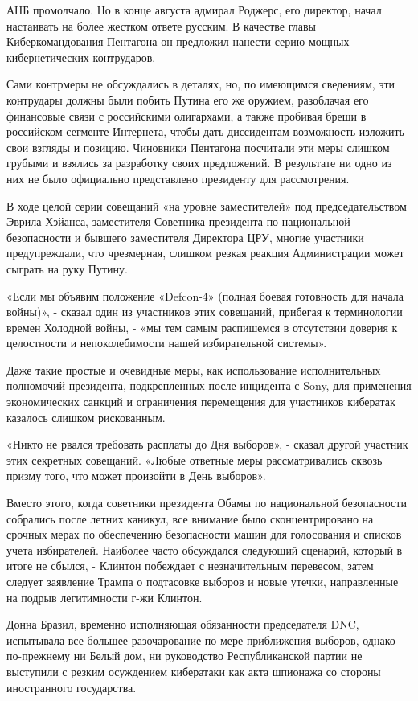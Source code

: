 АНБ промолчало. Но в конце августа адмирал Роджерс, его директор, начал
настаивать на более жестком ответе русским. В качестве главы
Киберкомандования Пентагона он предложил нанести серию мощных
кибернетических контрударов.

Сами контрмеры не обсуждались в деталях, но, по имеющимся сведениям, эти
контрудары должны были побить Путина его же оружием, разоблачая его
финансовые связи с российскими олигархами, а также пробивая бреши в
российском сегменте Интернета, чтобы дать диссидентам возможность
изложить свои взгляды и позицию. Чиновники Пентагона посчитали эти меры
слишком грубыми и взялись за разработку своих предложений. В результате
ни одно из них не было официально представлено президенту для
рассмотрения.

В ходе целой серии совещаний «на уровне заместителей» под
председательством Эврила Хэйанса, заместителя Советника президента по
национальной безопасности и бывшего заместителя Директора ЦРУ, многие
участники предупреждали, что чрезмерная, слишком резкая реакция
Администрации может сыграть на руку Путину.

«Если мы объявим положение «Defcon-4» (полная боевая готовность для
начала войны)», - сказал один из участников этих совещаний, прибегая к
терминологии времен Холодной войны, - «мы тем самым распишемся в
отсутствии доверия к целостности и непоколебимости нашей избирательной
системы».

Даже такие простые и очевидные меры, как использование исполнительных
полномочий президента, подкрепленных после инцидента с Sony, для
применения экономических санкций и ограничения перемещения для
участников кибератак казалось слишком рискованным.

«Никто не рвался требовать расплаты до Дня выборов», - сказал другой
участник этих секретных совещаний. «Любые ответные меры рассматривались
сквозь призму того, что может произойти в День выборов».

Вместо этого, когда советники президента Обамы по национальной
безопасности собрались после летних каникул, все внимание было
сконцентрировано на срочных мерах по обеспечению безопасности машин для
голосования и списков учета избирателей. Наиболее часто обсуждался
следующий сценарий, который в итоге не сбылся, - Клинтон побеждает с
незначительным перевесом, затем следует заявление Трампа о подтасовке
выборов и новые утечки, направленные на подрыв легитимности г-жи
Клинтон.

Донна Бразил, временно исполняющая обязанности председателя DNC,
испытывала все большее разочарование по мере приближения выборов, однако
по-прежнему ни Белый дом, ни руководство Республиканской партии не
выступили с резким осуждением кибератаки как акта шпионажа со стороны
иностранного государства.

